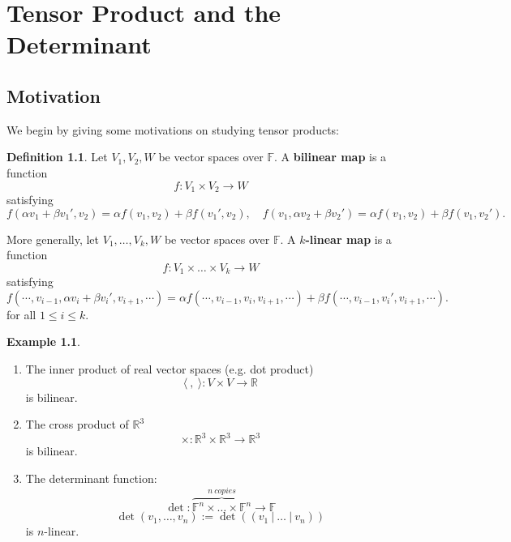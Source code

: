 \documentclass[11pt,openany]{book}
\theoremstyle{plain}
\theoremstyle{definition}
\newtheorem{definition}[definition]{Definition}
\newtheorem{example}[example]{Example}
\theoremstyle{remark}
\begin{document}
\chapter{Tensor Product and the Determinant}

\section{Motivation} We begin by giving some motivations on studying tensor products:

\begin{definition}
Let $V_1, V_2, W$ be vector spaces over $\mathbb{F}$. A {\bf bilinear map} is a function $$f : V_1 \times V_2 \to W$$ satisfying
$$f(\alpha v_1 + \beta v_1', v_2) = \alpha f(v_1, v_2) + \beta f(v_1', v_2), \quad f(v_1, \alpha v_2 + \beta v_2') = \alpha f(v_1, v_2) + \beta f(v_1, v_2').$$

More generally, let $V_1, \dots, V_k, W$ be vector spaces over $\mathbb{F}$. A {\bf $k$-linear map} is a function $$f : V_1 \times \dots \times V_k \to W$$ satisfying
$$f(\cdots, v_{i-1}, \alpha v_i + \beta v_i', v_{i+1}, \cdots) = \alpha f(\cdots, v_{i-1}, v_i, v_{i+1}, \cdots) + \beta f(\cdots, v_{i-1}, v_i', v_{i+1}, \cdots).$$
for all $1 \leq i \leq k$.
\end{definition}

\begin{example} \label{eg-klinear}\
    \begin{enumerate}
        \item The inner product of real vector spaces (e.g. dot product) 
        $$\langle\ ,\ \rangle: V \times V \to \mathbb{R}$$
        is bilinear.
        \item The cross product of $\mathbb{R}^3$ 
        $$\times: \mathbb{R}^3 \times \mathbb{R}^3 \to \mathbb{R}^3$$
        is bilinear.
        \item The determinant function:
        $$\det: \overbrace{\mathbb{F}^n \times \dots \times \mathbb{F}^n}^{n\ copies} \to \mathbb{F}$$
        $$\det(v_1, \dots, v_n) := \det((v_1\ |\ \dots\ |\ v_n))$$
        is $n$-linear.
    \end{enumerate}
\end{example}
\end{document}
